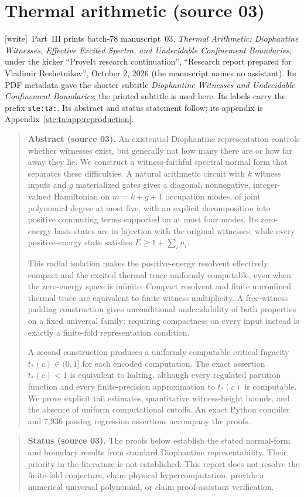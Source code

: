 \documentclass[11pt,letterpaper]{article}
\theoremstyle{definition}
\theoremstyle{remark}
\newcommand{\wtag}{\textup{[write]}}
\begin{document}
\part{Thermal arithmetic (source 03)}\label{ste:part:ta}

\noindent\wtag\ Part~III prints batch-78 manuscript~03, \emph{Thermal Arithmetic: Diophantine Witnesses, Effective Excited Spectra, and Undecidable Confinement Boundaries}, under the kicker ``ProveIt research continuation'', ``Research report prepared for Vladimir Reshetnikov'', October 2, 2026 (the manuscript names no assistant). Its PDF metadata gave the shorter subtitle \emph{Diophantine Witnesses and Undecidable Confinement Boundaries}; the printed subtitle is used here. Its labels carry the prefix \texttt{ste:ta:}. Its abstract and status statement follow; its appendix is Appendix~\ref{ste:ta:app:reproduction}.

\begin{quote}\small
\textbf{Abstract (source 03).} An existential Diophantine representation controls whether witnesses exist, but generally not how many there are or how far away they lie. We construct a witness-faithful spectral normal form that separates these difficulties. A natural arithmetic circuit with $k$ witness inputs and $g$ materialized gates gives a diagonal, nonnegative, integer-valued Hamiltonian on $m=k+g+1$ occupation modes, of joint polynomial degree at most five, with an explicit decomposition into positive commuting terms supported on at most four modes. Its zero-energy basis states are in bijection with the original witnesses, while every positive-energy state satisfies $E\ge1+\sum_i n_i$.

This radial isolation makes the positive-energy resolvent effectively compact and the excited thermal trace uniformly computable, even when the zero-energy space is infinite. Compact resolvent and finite unconfined thermal trace are equivalent to finite witness multiplicity. A free-witness padding construction gives unconditional undecidability of both properties on a fixed universal family; requiring compactness on every input instead is exactly a finite-fold representation condition.

A second construction produces a uniformly computable critical fugacity $t_*(c)\in(0,1]$ for each encoded computation. The exact assertion $t_*(c)<1$ is equivalent to halting, although every regulated partition function and every finite-precision approximation to $t_*(c)$ is computable. We prove explicit tail estimates, quantitative witness-height bounds, and the absence of uniform computational cutoffs. An exact Python compiler and 7,936 passing regression assertions accompany the proofs.
\end{quote}
\begin{quote}\small
\textbf{Status (source 03).} The proofs below establish the stated normal-form and boundary results from standard Diophantine representability. Their priority in the literature is not established. This report does not resolve the finite-fold conjecture, claim physical hypercomputation, provide a numerical universal polynomial, or claim proof-assistant verification.
\end{quote}
\end{document}
